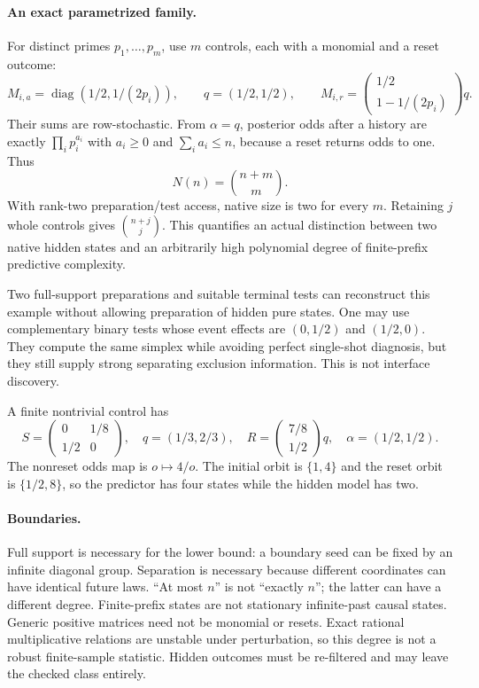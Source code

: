 \documentclass[11pt]{article}
\theoremstyle{remark}
\newcommand{\diag}{\operatorname{diag}}
\begin{document}
\paragraph{An exact parametrized family.}
For distinct primes $p_1,\ldots,p_m$, use $m$ controls, each with a monomial and a reset outcome:
\[
 M_{i,a}=\diag(1/2,1/(2p_i)),\qquad
 q=(1/2,1/2),\qquad
 M_{i,r}=\begin{pmatrix}1/2\\1-1/(2p_i)\end{pmatrix}q.
\]
Their sums are row-stochastic. From $\alpha=q$, posterior odds after a history are exactly $\prod_i p_i^{a_i}$ with $a_i\geq0$ and $\sum_i a_i\leq n$, because a reset returns odds to one. Thus
\[
 N(n)=\binom{n+m}{m}.
\]
With rank-two preparation/test access, native size is two for every $m$. Retaining $j$ whole controls gives $\binom{n+j}{j}$. This quantifies an actual distinction between two native hidden states and an arbitrarily high polynomial degree of finite-prefix predictive complexity.

Two full-support preparations and suitable terminal tests can reconstruct this example without allowing preparation of hidden pure states. One may use complementary binary tests whose event effects are $(0,1/2)$ and $(1/2,0)$. They compute the same simplex while avoiding perfect single-shot diagnosis, but they still supply strong separating exclusion information. This is not interface discovery.

A finite nontrivial control has
\[
 S=\begin{pmatrix}0&1/8\\1/2&0\end{pmatrix},\quad
 q=(1/3,2/3),\quad R=\begin{pmatrix}7/8\\1/2\end{pmatrix}q,
 \quad\alpha=(1/2,1/2).
\]
The nonreset odds map is $o\mapsto4/o$. The initial orbit is $\{1,4\}$ and the reset orbit is $\{1/2,8\}$, so the predictor has four states while the hidden model has two.

\paragraph{Boundaries.}
Full support is necessary for the lower bound: a boundary seed can be fixed by an infinite diagonal group. Separation is necessary because different coordinates can have identical future laws. ``At most $n$'' is not ``exactly $n$''; the latter can have a different degree. Finite-prefix states are not stationary infinite-past causal states. Generic positive matrices need not be monomial or resets. Exact rational multiplicative relations are unstable under perturbation, so this degree is not a robust finite-sample statistic. Hidden outcomes must be re-filtered and may leave the checked class entirely.
\end{document}
